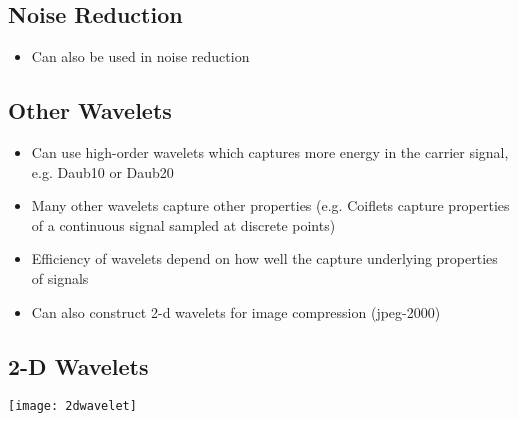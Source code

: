 
\begin{slide}
\section[-1]{Noise Reduction}

\pb\pause{}
\begin{itemize}
\item Can also be used in noise reduction\pause
\end{itemize}
\begin{center}
  \pause
\end{center}

\end{slide}


\begin{slide}
\section{Other Wavelets}

\begin{PauseHighLight}
  \begin{itemize}
  \item Can use high-order wavelets which captures more energy in the
    carrier signal, e.g. Daub10 or Daub20\pause
  \item Many other wavelets capture other properties (e.g. Coiflets
    capture properties of a continuous signal sampled at discrete
    points)\pause
  \item Efficiency of wavelets depend on how well the capture underlying
    properties of signals\pause
  \item Can also construct 2-d wavelets for image compression
    (jpeg-2000)\pause
  \end{itemize}
\end{PauseHighLight}

\end{slide}


\begin{slide}
\section[-2]{2-D Wavelets}

\begin{center}
  \texttt{[image: 2dwavelet]}
\end{center}
\end{slide}



